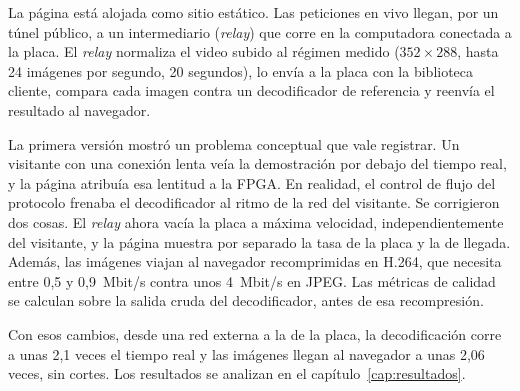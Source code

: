 La página está alojada como sitio estático. Las peticiones en vivo llegan, por
un túnel público, a un intermediario (\emph{relay}) que corre en la
computadora conectada a la placa. El \emph{relay} normaliza el video subido al
régimen medido ($352 \times 288$, hasta 24 imágenes por segundo, 20
segundos), lo envía a la placa con la biblioteca cliente, compara cada imagen
contra un decodificador de referencia y reenvía el resultado al navegador.

La primera versión mostró un problema conceptual que vale registrar. Un
visitante con una conexión lenta veía la demostración por debajo del tiempo
real, y la página atribuía esa lentitud a la FPGA. En realidad, el control de
flujo del protocolo frenaba el decodificador al ritmo de la red del visitante.
Se corrigieron dos cosas. El \emph{relay} ahora vacía la placa a máxima
velocidad, independientemente del visitante, y la página muestra por
separado la tasa de la placa y la de llegada. Además, las imágenes viajan al
navegador recomprimidas en H.264, que necesita entre 0,5 y 0,9~Mbit/s
contra unos 4~Mbit/s en JPEG. Las métricas de calidad se calculan sobre la
salida cruda del decodificador, antes de esa recompresión.

Con esos cambios, desde una red externa a la de la placa, la decodificación
corre a unas 2,1 veces el tiempo real y las imágenes llegan al navegador a
unas 2,06 veces, sin cortes. Los resultados se analizan en el
capítulo~\ref{cap:resultados}.
